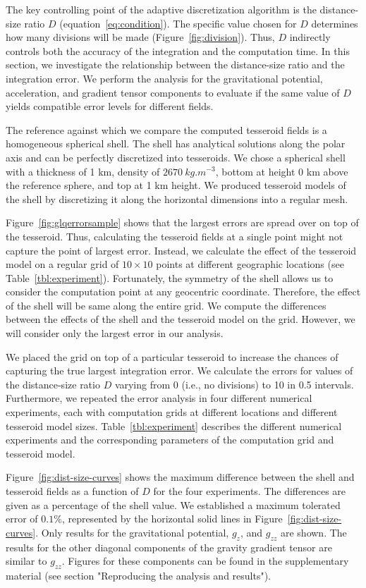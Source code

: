 \documentclass[manuscript,endfloat]{geophysics}
\begin{document}
The key controlling point of the adaptive discretization algorithm
is the distance-size ratio $D$ (equation~\ref{eq:condition}).
The specific value chosen for $D$ determines how many divisions will be made
(Figure~\ref{fig:division}).
Thus, $D$ indirectly controls both the accuracy of the integration
and the computation time.
In this section, we investigate the relationship between
the distance-size ratio and the integration error.
We perform the analysis for the gravitational potential,
acceleration, and gradient tensor components
to evaluate if the same value of $D$ yields compatible error levels
for different fields.

The reference against which we compare the computed tesseroid fields
is a homogeneous spherical shell.
The shell has analytical solutions along the polar axis
\citep{Grombein2013}
and can be perfectly discretized into tesseroids.
We chose a spherical shell with a thickness of 1 km,
density of $2670\ kg.m^{-3}$,
bottom at height 0 km above the reference sphere,
and top at 1 km height.
We produced tesseroid models of the shell by discretizing it along the
horizontal dimensions into a regular mesh.


Figure~\ref{fig:glqerrorsample} shows that the largest errors are spread over
on top of the tesseroid.
Thus, calculating the tesseroid fields at a single point might not
capture the point of largest error.
Instead, we calculate the effect of the tesseroid model on a regular grid
of $10 \times 10$ points at different geographic locations
(see Table~\ref{tbl:experiment}).
Fortunately, the symmetry of the shell allows us to consider the computation
point at any geocentric coordinate.
Therefore, the effect of the shell will be same along the entire grid.
We compute the differences between the effects of the shell and the tesseroid
model on the grid.
However, we will consider only the largest error in our analysis.


We placed the grid on top of a particular tesseroid
to increase the chances of capturing the true largest integration error.
We calculate the errors for values of the distance-size ratio
$D$ varying from 0 (i.e., no divisions) to 10 in 0.5 intervals.
Furthermore, we repeated the error analysis in four different numerical experiments,
each with computation grids at different locations and
different tesseroid model sizes.
Table~\ref{tbl:experiment} describes the different numerical
experiments and the corresponding parameters of the computation grid and
tesseroid model.


Figure~\ref{fig:dist-size-curves} shows
the maximum difference between the shell and tesseroid fields
as a function of $D$ for the four experiments.
The differences are given as a percentage of the shell value.
We established a maximum tolerated error of $0.1\%$, represented by the
horizontal solid lines in Figure~\ref{fig:dist-size-curves}.
Only results for the gravitational potential, $g_z$, and $g_{zz}$ are shown.
The results for the other diagonal components of the gravity gradient tensor
are similar to $g_{zz}$.
Figures for these components can be found in the supplementary material
(see section "Reproducing the analysis and results").
\end{document}
